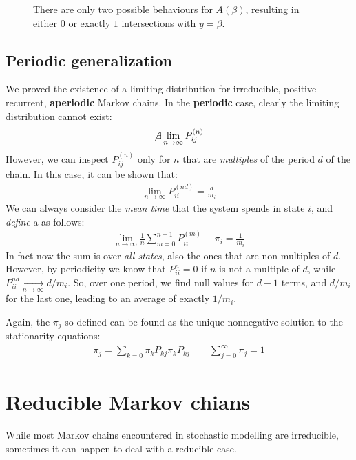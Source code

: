 \documentclass[../template.tex]{subfiles}
\begin{document}
\begin{figure}[htp]
    \centering
    \caption{There are only two possible behaviours for $A(\beta)$, resulting in either $0$ or exactly $1$ intersections with $y = \beta$.\label{fig:abeta-behaviours}}
\end{figure}

\subsection{Periodic generalization}
We proved the existence of a limiting distribution for irreducible, positive recurrent, \textbf{aperiodic} Markov chains. In the \textbf{periodic} case, clearly the limiting distribution cannot exist:
\begin{align*}
    \not\exists \lim_{n \to \infty} P_{ij}^{(n)}
\end{align*} 
However, we can inspect $P_{ij}^{(n)}$ only for $n$ that are \textit{multiples} of the period $d$ of the chain. In this case, it can be shown that:
\begin{align*}
    \lim_{n \to \infty} P_{i i}^{(nd)} = \frac{d}{m_i} 
\end{align*} 
We can always consider the \textit{mean time} that the system spends in state $i$, and \textit{define} a  as follows:
\begin{align*}
    \lim_{n \to \infty} \frac{1}{n} \sum_{m=0}^{n-1} P_{i i}^{(m)} \equiv \pi_i = \frac{1}{m_i}  
\end{align*}
In fact now the sum is over \textit{all states}, also the ones that are non-multiples of $d$. However, by periodicity we know that $P_{i i}^{n} = 0$ if $n$ is not a multiple of $d$, while $P_{i i}^{nd}  \xrightarrow[n \to \infty]{} d/m_i$. So, over one period, we find null values for $d-1$ terms, and $d/m_i$ for the last one, leading to an average of exactly $1/m_i$.

Again, the $\pi_j$ so defined can be found as the unique nonnegative solution to the stationarity equations:
\begin{align*}
    \pi_j = \sum_{k=0} \pi_k P_{kj} \pi_k P_{kj} \qquad \sum_{j=0}^\infty \pi_j = 1
\end{align*}

\section{Reducible Markov chians}
While most Markov chains encountered in stochastic modelling are irreducible, sometimes it can happen to deal with a reducible case.
\end{document}
